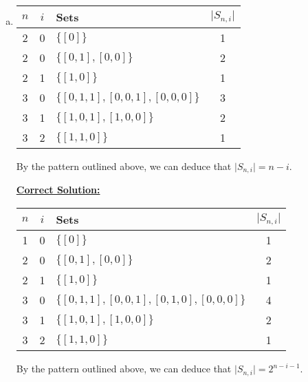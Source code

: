 \documentclass[12pt]{article}
\begin{document}
\begin{enumerate}[a.]
\begin{itemize}
    \end{itemize}

    \item

    \begin{tabular}{|c|c|l|c|}
        \hline
        $n$ & $i$ & Sets & $\lvert S_{n,i} \rvert$\\
        \hline
        2 & 0 & $\{[0]\}$ & 1\\
        \hline
        2 & 0 & $\{[0,1],[0,0]\}$ & 2\\
        \hline
        2 & 1 & $\{[1,0]\}$ & 1\\
        \hline
        3 & 0 & $\{[0,1,1],[0,0,1],[0,0,0]\}$ & 3\\
        \hline
        3 & 1 & $\{[1,0,1],[1,0,0]\}$ & 2\\
        \hline
        3 & 2 & $\{[1,1,0]\}$ & 1\\
        \hline
    \end{tabular}

    \bigskip

    By the pattern outlined above, we can deduce that $\lvert S_{n,i} \rvert = n - i$.

    \bigskip

    \begin{mdframed}
        \underline{\textbf{Correct Solution:}}

        \bigskip

        \begin{tabular}{|c|c|l|c|}
            \hline
            $n$ & $i$ & Sets & $\lvert S_{n,i} \rvert$\\
            \hline
            \color{red}1 & 0 & $\{[0]\}$ & 1\\
            \hline
            2 & 0 & $\{[0,1],[0,0]\}$ & 2\\
            \hline
            2 & 1 & $\{[1,0]\}$ & 1\\
            \hline
            3 & 0 & \color{red}$\{[0,1,1],[0,0,1],[0,1,0],[0,0,0]\}$ & \color{red}4\\
            \hline
            3 & 1 & $\{[1,0,1],[1,0,0]\}$ & 2\\
            \hline
            3 & 2 & $\{[1,1,0]\}$ & 1\\
            \hline
        \end{tabular}

        \bigskip

        By the pattern outlined above, we can deduce that \color{red}$\lvert S_{n,i} \rvert = 2^{n-i-1}$\color{black}.

    \end{mdframed}
\end{enumerate}
\end{document}
